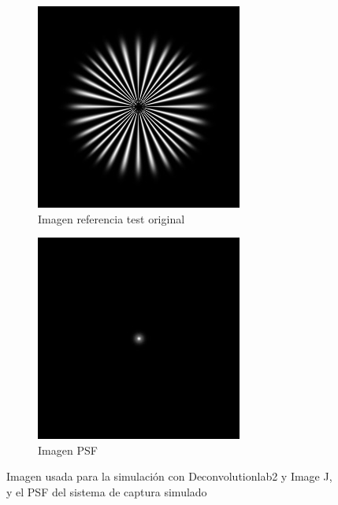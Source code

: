 \documentclass{./packages/optica-article}
\begin{document}
\begin{figure}[hbp]
	\centering
	\begin{subfigure}[t]{0.45\textwidth}\centering
		\centering
		\includegraphics[width=\textwidth]{Simulation deconvolution/ref.jpg}
		\caption{Imagen referencia test original}\label{fig:ref}
	\end{subfigure}
	\hfill
	\begin{subfigure}[t]{0.45\textwidth}\centering
		\includegraphics[width=\textwidth]{Simulation deconvolution/psf.jpg}
		\caption{Imagen PSF}\label{fig:psf}
	\end{subfigure}
	\caption{Imagen usada para la simulación con Deconvolutionlab2 y Image J, y el PSF del sistema de captura simulado}\label{fig:image:ref-psf}
\end{figure}
 
\end{document}
